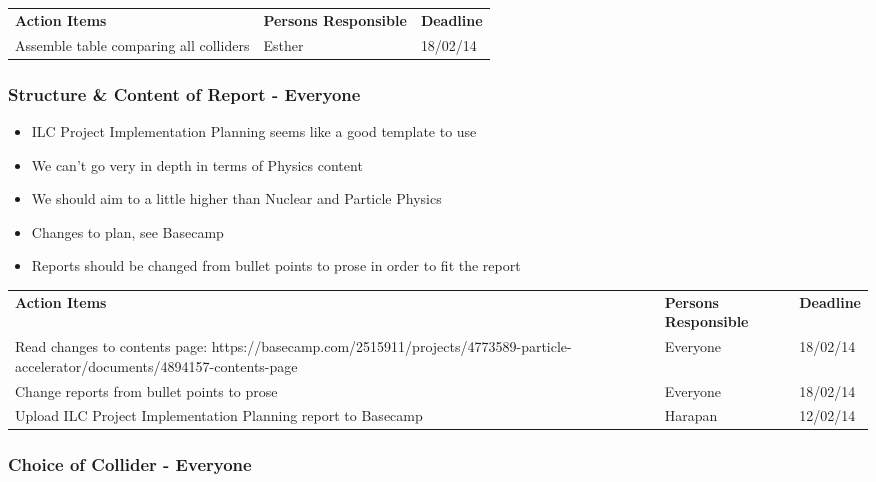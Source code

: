 \begin{tabularx}{\textwidth}{X p{4.5cm} p{1.2cm}}
  \textbf{Action Items} & \textbf{Persons Responsible} & \textbf{Deadline} \\
  Assemble table comparing all colliders &
Esther & 
18/02/14 \\
\end{tabularx}

\subsubsection{Structure \& Content of Report - Everyone}

\begin{itemize}
\item ILC Project Implementation Planning seems like a good template to use
\item  We can’t go very in depth in terms of Physics content
\item We should aim to a little higher than Nuclear and Particle Physics
\item Changes to plan, see Basecamp
\item Reports should be changed from bullet points to prose in order to fit the report
\end{itemize}

\begin{tabularx}{\textwidth}{X p{4.5cm} p{1.2cm}}
  \textbf{Action Items} & \textbf{Persons Responsible} & \textbf{Deadline} \\
Read changes to contents page: https://basecamp.com/2515911/projects/4773589-particle-accelerator/documents/4894157-contents-page &
Everyone & 
18/02/14\\

Change reports from bullet points to prose &
Everyone &
18/02/14 \\

Upload ILC Project Implementation Planning report to Basecamp &
Harapan &
12/02/14 \\

\end{tabularx}

\subsubsection{Choice of Collider - Everyone}

